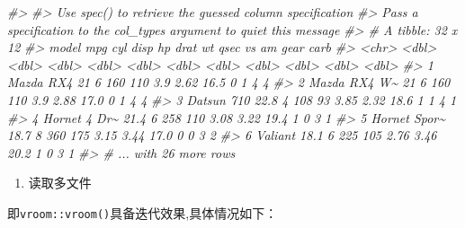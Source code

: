 \documentclass[
]{book}
\newenvironment{Shaded}{\begin{snugshade}}{\end{snugshade}}
\newcommand{\CommentTok}[1]{\textcolor[rgb]{0.56,0.35,0.01}{\textit{#1}}}
\providecommand{\tightlist}{%
  \setlength{\itemsep}{0pt}\setlength{\parskip}{0pt}}
\begin{document}
\begin{Shaded}
\begin{Highlighting}[]
\CommentTok{\#\textgreater{} }
\CommentTok{\#\textgreater{} Use \textasciigrave{}spec()\textasciigrave{} to retrieve the guessed column specification}
\CommentTok{\#\textgreater{} Pass a specification to the \textasciigrave{}col\_types\textasciigrave{} argument to quiet this message}
\CommentTok{\#\textgreater{} \# A tibble: 32 x 12}
\CommentTok{\#\textgreater{}   model          mpg   cyl  disp    hp  drat    wt  qsec    vs    am  gear  carb}
\CommentTok{\#\textgreater{}   \textless{}chr\textgreater{}        \textless{}dbl\textgreater{} \textless{}dbl\textgreater{} \textless{}dbl\textgreater{} \textless{}dbl\textgreater{} \textless{}dbl\textgreater{} \textless{}dbl\textgreater{} \textless{}dbl\textgreater{} \textless{}dbl\textgreater{} \textless{}dbl\textgreater{} \textless{}dbl\textgreater{} \textless{}dbl\textgreater{}}
\CommentTok{\#\textgreater{} 1 Mazda RX4     21       6   160   110  3.9   2.62  16.5     0     1     4     4}
\CommentTok{\#\textgreater{} 2 Mazda RX4 W\textasciitilde{}  21       6   160   110  3.9   2.88  17.0     0     1     4     4}
\CommentTok{\#\textgreater{} 3 Datsun 710    22.8     4   108    93  3.85  2.32  18.6     1     1     4     1}
\CommentTok{\#\textgreater{} 4 Hornet 4 Dr\textasciitilde{}  21.4     6   258   110  3.08  3.22  19.4     1     0     3     1}
\CommentTok{\#\textgreater{} 5 Hornet Spor\textasciitilde{}  18.7     8   360   175  3.15  3.44  17.0     0     0     3     2}
\CommentTok{\#\textgreater{} 6 Valiant       18.1     6   225   105  2.76  3.46  20.2     1     0     3     1}
\CommentTok{\#\textgreater{} \# ... with 26 more rows}
\end{Highlighting}
\end{Shaded}

\begin{enumerate}
\def\labelenumi{\arabic{enumi}.}
\setcounter{enumi}{1}
\tightlist
\item
  读取多文件
\end{enumerate}

即\texttt{vroom::vroom()}具备迭代效果,具体情况如下：
\end{document}
